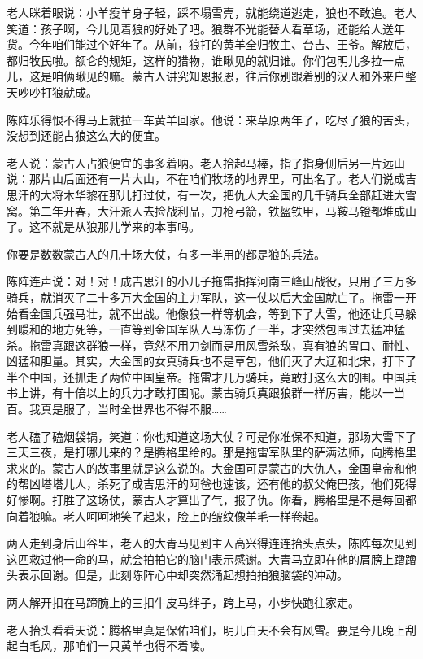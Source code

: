 \par 老人眯着眼说：小羊瘦羊身子轻，踩不塌雪壳，就能绕道逃走，狼也不敢追。老人笑道：孩子啊，今儿见着狼的好处了吧。狼群不光能替人看草场，还能给人送年货。今年咱们能过个好年了。从前，狼打的黄羊全归牧主、台吉、王爷。解放后，都归牧民啦。额仑的规矩，这样的猎物，谁瞅见的就归谁。你们包明儿多拉一点儿，这是咱俩瞅见的嘛。蒙古人讲究知恩报恩，往后你别跟着别的汉人和外来户整天吵吵打狼就成。
\par 陈阵乐得恨不得马上就拉一车黄羊回家。他说：来草原两年了，吃尽了狼的苦头，没想到还能占狼这么大的便宜。
\par 老人说：蒙古人占狼便宜的事多着呐。老人拾起马棒，指了指身侧后另一片远山说：那片山后面还有一片大山，不在咱们牧场的地界里，可出名了。老人们说成吉思汗的大将木华黎在那儿打过仗，有一次，把仇人大金国的几千骑兵全部赶进大雪窝。第二年开春，大汗派人去捡战利品，刀枪弓箭，铁盔铁甲，马鞍马镫都堆成山了。这不就是从狼那儿学来的本事吗。
\par 你要是数数蒙古人的几十场大仗，有多一半用的都是狼的兵法。
\par 陈阵连声说：对！对！成吉思汗的小儿子拖雷指挥河南三峰山战役，只用了三万多骑兵，就消灭了二十多万大金国的主力军队，这一仗以后大金国就亡了。拖雷一开始看金国兵强马壮，就不出战。他像狼一样等机会，等到下了大雪，他还让兵马躲到暖和的地方死等，一直等到金国军队人马冻伤了一半，才突然包围过去猛冲猛杀。拖雷真跟这群狼一样，竟然不用刀剑而是用风雪杀敌，真有狼的胃口、耐性、凶猛和胆量。其实，大金国的女真骑兵也不是草包，他们灭了大辽和北宋，打下了半个中国，还抓走了两位中国皇帝。拖雷才几万骑兵，竟敢打这么大的围。中国兵书上讲，有十倍以上的兵力才敢打围呢。蒙古骑兵真跟狼群一样厉害，能以一当百。我真是服了，当时全世界也不得不服……
\par 老人磕了磕烟袋锅，笑道：你也知道这场大仗？可是你准保不知道，那场大雪下了三天三夜，是打哪儿来的？是腾格里给的。那是拖雷军队里的萨满法师，向腾格里求来的。蒙古人的故事里就是这么说的。大金国可是蒙古的大仇人，金国皇帝和他的帮凶塔塔儿人，杀死了成吉思汗的阿爸也速该，还有他的叔父俺巴孩，他们死得好惨啊。打胜了这场仗，蒙古人才算出了气，报了仇。你看，腾格里是不是每回都向着狼嘛。老人呵呵地笑了起来，脸上的皱纹像羊毛一样卷起。
\par 两人走到身后山谷里，老人的大青马见到主人高兴得连连抬头点头，陈阵每次见到这匹救过他一命的马，就会拍拍它的脑门表示感谢。大青马立即在他的肩膀上蹭蹭头表示回谢。但是，此刻陈阵心中却突然涌起想拍拍狼脑袋的冲动。
\par 两人解开扣在马蹄腕上的三扣牛皮马绊子，跨上马，小步快跑往家走。
\par 老人抬头看看天说：腾格里真是保佑咱们，明儿白天不会有风雪。要是今儿晚上刮起白毛风，那咱们一只黄羊也得不着喽。






